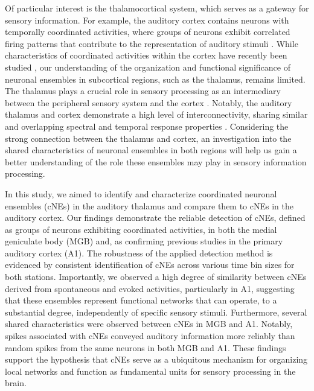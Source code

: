 \documentclass[11pt]{article}
\begin{document}
Of particular interest is the thalamocortical system, which serves as a gateway for sensory information. For example, the auditory cortex contains neurons with temporally coordinated activities, where groups of neurons exhibit correlated firing patterns that contribute to the representation of auditory stimuli \citep{ince2013neural, kreiter1996stimulus, miller2009populations, See2018}. While characteristics of coordinated activities within the cortex have recently been studied \citep{bathellier2012discrete, chamberland2017fast, See2018, See2021}, our understanding of the organization and functional significance of neuronal ensembles in subcortical regions, such as the thalamus, remains limited. The thalamus plays a crucial role in sensory processing as an intermediary between the peripheral sensory system and the cortex \citep{bartlett2013organization}. Notably, the auditory thalamus and cortex demonstrate a high level of interconnectivity, sharing similar and overlapping spectral and temporal response properties \citep{bartlett2007neural, Miller2002}. Considering the strong connection between the thalamus and cortex, an investigation into the shared characteristics of neuronal ensembles in both regions will help us gain a better understanding of the role these ensembles may play in sensory information processing.

In this study, we aimed to identify and characterize coordinated neuronal ensembles (cNEs) in the auditory thalamus and compare them to cNEs in the auditory cortex. Our findings demonstrate the reliable detection of cNEs, defined as groups of neurons exhibiting coordinated activities, in both the medial geniculate body (MGB) and, as confirming previous studies \citep{See2018, See2021} in the primary auditory cortex (A1). The robustness of the applied detection method is evidenced by consistent identification of cNEs across various time bin sizes for both stations. Importantly, we observed a high degree of similarity between cNEs derived from spontaneous and evoked activities, particularly in A1, suggesting that these ensembles represent functional networks that can operate, to a substantial degree, independently of specific sensory stimuli. Furthermore, several shared characteristics were observed between cNEs in MGB and A1. Notably, spikes associated with cNEs conveyed auditory information more reliably than random spikes from the same neurons in both MGB and A1. These findings support the hypothesis that cNEs serve as a ubiquitous mechanism for organizing local networks and function as fundamental units for sensory processing in the brain.
\end{document}
